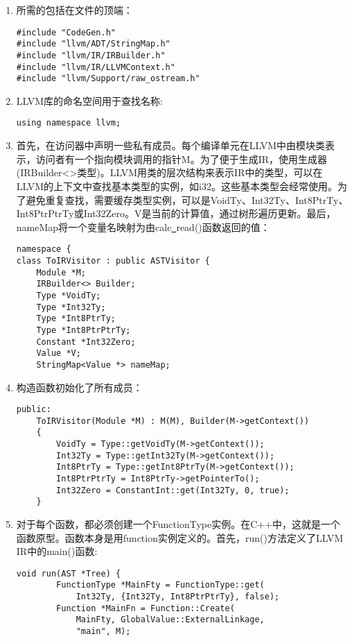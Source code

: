 \begin{enumerate}
\item 所需的包括在文件的顶端：
\begin{lstlisting}[caption={}]
#include "CodeGen.h"
#include "llvm/ADT/StringMap.h"
#include "llvm/IR/IRBuilder.h"
#include "llvm/IR/LLVMContext.h"
#include "llvm/Support/raw_ostream.h"
\end{lstlisting}

\item LLVM库的命名空间用于查找名称:
\begin{lstlisting}[caption={}]
using namespace llvm;
\end{lstlisting}

\item 首先，在访问器中声明一些私有成员。每个编译单元在LLVM中由模块类表示，访问者有一个指向模块调用的指针M。为了便于生成IR，使用生成器(IRBuilder<>类型)。LLVM用类的层次结构来表示IR中的类型，可以在LLVM的上下文中查找基本类型的实例，如i32。这些基本类型会经常使用。为了避免重复查找，需要缓存类型实例，可以是VoidTy、Int32Ty、Int8PtrTy、Int8PtrPtrTy或Int32Zero。V是当前的计算值，通过树形遍历更新。最后，nameMap将一个变量名映射为由calc\underline{~}read()函数返回的值：
\begin{lstlisting}[caption={}]
namespace {
class ToIRVisitor : public ASTVisitor {
	Module *M;
	IRBuilder<> Builder;
	Type *VoidTy;
	Type *Int32Ty;
	Type *Int8PtrTy;
	Type *Int8PtrPtrTy;
	Constant *Int32Zero;
	Value *V;
	StringMap<Value *> nameMap;
\end{lstlisting}

\item 构造函数初始化了所有成员：
\begin{lstlisting}[caption={}]
public:
	ToIRVisitor(Module *M) : M(M), Builder(M->getContext())
	{
		VoidTy = Type::getVoidTy(M->getContext());
		Int32Ty = Type::getInt32Ty(M->getContext());
		Int8PtrTy = Type::getInt8PtrTy(M->getContext());
		Int8PtrPtrTy = Int8PtrTy->getPointerTo();
		Int32Zero = ConstantInt::get(Int32Ty, 0, true);
	}
\end{lstlisting}

\item 对于每个函数，都必须创建一个FunctionType实例。在C++中，这就是一个函数原型。函数本身是用function实例定义的。首先，run()方法定义了LLVM IR中的main()函数:
\begin{lstlisting}[caption={}]
	void run(AST *Tree) {
		FunctionType *MainFty = FunctionType::get(
			Int32Ty, {Int32Ty, Int8PtrPtrTy}, false);
		Function *MainFn = Function::Create(
			MainFty, GlobalValue::ExternalLinkage,
			"main", M);
\end{lstlisting}


\end{enumerate}
